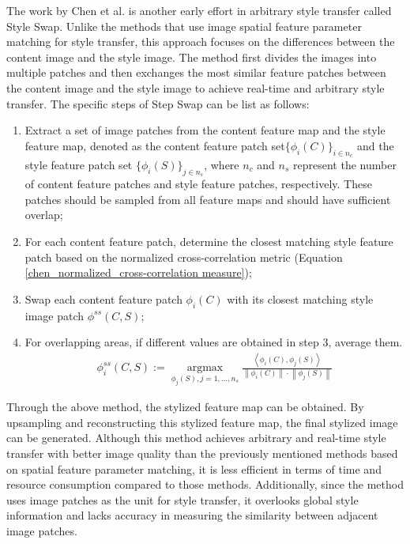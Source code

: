 \documentclass[preprint,12pt]{elsarticle}
\begin{document}
The work by Chen et al.\citep{43chen2016fast} is another early effort in arbitrary style transfer called Style Swap. Unlike the methods\citep{04huang2017arbitrary,39dumoulin2016learned,41jing2020dynamic} that use image spatial feature parameter matching for style transfer, this approach focuses on the differences between the content image and the style image. The method first divides the images into multiple patches and then exchanges the most similar feature patches between the content image and the style image to achieve real-time and arbitrary style transfer. The specific steps of Step Swap can be list as follows: 
\begin{enumerate}
    \item  Extract a set of image patches from the content feature map and the style feature map, denoted as the content feature patch set$\{\phi_i(C)\}_{i\in n_c}$ and the style feature patch set $\{\phi_i(S)\}_{j\in n_s}$, where $n_c$ and $n_s$ represent the number of content feature patches and style feature patches, respectively. These patches should be sampled from all feature maps and should have sufficient overlap;
    \item  For each content feature patch, determine the closest matching style feature patch based on the normalized cross-correlation metric (Equation \ref{chen_normalized_cross-correlation measure});
    \item Swap each content feature patch $\phi_i(C)$ with its closest matching style image patch $\phi^{ss}(C,S)$;
    \item   For overlapping areas, if different values are obtained in step 3, average them.
    \begin{equation}
        \begin{aligned}
            \label{chen_normalized_cross-correlation measure}
            \phi_{i}^{s s}(C, S):=\underset{\phi_{j}(S), j=1, \ldots, n_{s}}{\operatorname{argmax}} \frac{\left\langle\phi_{i}(C), \phi_{j}(S)\right\rangle}{\left\|\phi_{i}(C)\right\| \cdot\left\|\phi_{j}(S)\right\|}
        \end{aligned}
    \end{equation}
\end{enumerate}

Through the above method, the stylized feature map can be obtained. By upsampling and reconstructing this stylized feature map, the final stylized image can be generated. Although this method achieves arbitrary and real-time style transfer with better image quality than the previously mentioned methods based on spatial feature parameter matching\citep{04huang2017arbitrary,39dumoulin2016learned,41jing2020dynamic}, it is less efficient in terms of time and resource consumption compared to those methods. Additionally, since the method uses image patches as the unit for style transfer, it overlooks global style information and lacks accuracy in measuring the similarity between adjacent image patches.
\end{document}
